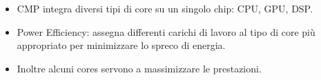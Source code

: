 \begin{itemize}
  \item CMP integra diversi tipi di core su un singolo chip: CPU, GPU, DSP. 
  \item Power Efficiency: assegna differenti carichi di lavoro al tipo di core più appropriato per minimizzare lo spreco di energia. 
  \item Inoltre alcuni cores servono a massimizzare le prestazioni. 
\end{itemize}













